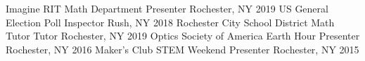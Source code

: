 \begin{cvhonors}
 \cvhonor
    {Imagine RIT Math Department}
    {Presenter}
    {Rochester, NY}
    {2019}
  \cvhonor
    {US General Election}
    {Poll Inspector}
    {Rush, NY}
    {2018}
 \cvhonor
    {Rochester City School District Math Tutor}
    {Tutor}
    {Rochester, NY}
    {2019}
  \cvhonor
    {Optics Society of America Earth Hour}
    {Presenter}
    {Rochester, NY}
    {2016}
  \cvhonor
    {Maker's Club STEM Weekend}
    {Presenter}
    {Rochester, NY}
    {2015}
\end{cvhonors}
